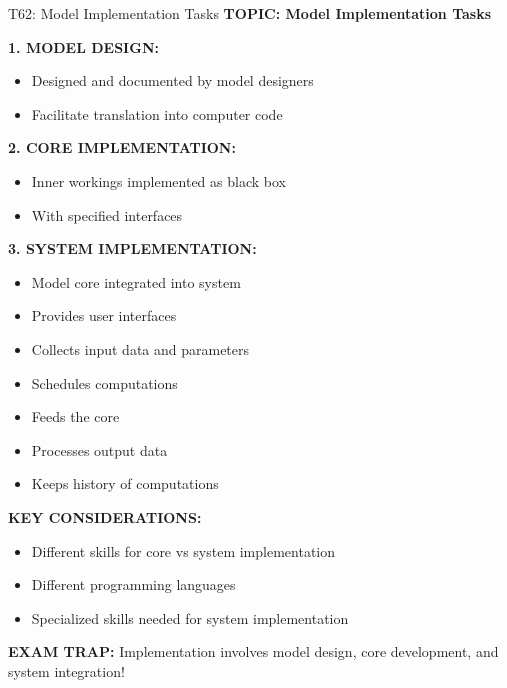 \documentclass[8pt]{beamer}
\begin{document}
	\begin{frame}{T62: Model Implementation Tasks}
		\fontsize{6.5}{7.5}\selectfont
		\textbf{TOPIC: Model Implementation Tasks}
		
		\vspace{0.1cm}
		\textbf{1. MODEL DESIGN:}
		\begin{itemize}
			\item Designed and documented by model designers
			\item Facilitate translation into computer code
		\end{itemize}
		
		\vspace{0.1cm}
		\textbf{2. CORE IMPLEMENTATION:}
		\begin{itemize}
			\item Inner workings implemented as black box
			\item With specified interfaces
		\end{itemize}
		
		\vspace{0.1cm}
		\textbf{3. SYSTEM IMPLEMENTATION:}
		\begin{itemize}
			\item Model core integrated into system
			\item Provides user interfaces
			\item Collects input data and parameters
			\item Schedules computations
			\item Feeds the core
			\item Processes output data
			\item Keeps history of computations
		\end{itemize}
		
		\vspace{0.1cm}
		\textbf{KEY CONSIDERATIONS:}
		\begin{itemize}
			\item Different skills for core vs system implementation
			\item Different programming languages
			\item Specialized skills needed for system implementation
		\end{itemize}
		
		\textcolor{myred}{\textbf{EXAM TRAP:}} Implementation involves \textcolor{myblue}{model design, core development, and system integration}!
	\end{frame}
	
\end{document}

